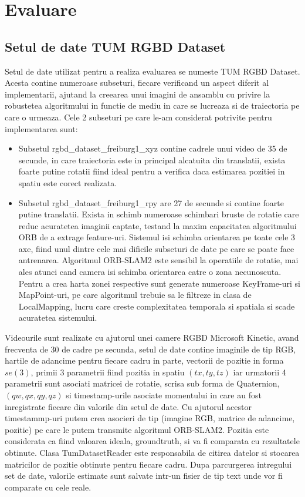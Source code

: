 \documentclass[12pt,a4paper]{report}
\begin{document}
\chapter{Evaluare}
\section{Setul de date TUM RGBD Dataset}
Setul de date utilizat pentru a realiza evaluarea se numeste TUM RGBD Dataset. 
Acesta contine numeroase subseturi, fiecare verificand un aspect diferit al implementarii, 
ajutand la creearea unui imagini de ansamblu cu privire la robustetea algoritmului in functie 
de mediu in care se lucreaza si de traiectoria pe care o urmeaza. Cele 2 subseturi pe 
care le-am considerat potrivite pentru implementarea sunt:
\begin{itemize}
    \item Subsetul rgbd\_dataset\_freiburg1\_xyz contine cadrele unui video de 35 de secunde, in care
traiectoria este in principal alcatuita din translatii, exista foarte putine rotatii fiind
ideal pentru a verifica daca estimarea pozitiei in spatiu este corect realizata.    
    \item  Subsetul rgbd\_dataset\_freiburg1\_rpy are 27 de secunde si contine 
foarte putine translatii. Exista in schimb numeroase schimbari bruste de rotatie care reduc
acuratetea imaginii captate, testand la maxim capacitatea algoritmului ORB de a extrage 
feature-uri. Sistemul isi schimba orientarea pe toate cele 3 axe, fiind unul dintre cele
mai dificile subseturi de date pe care se poate face antrenarea. Algoritmul 
ORB-SLAM2 este sensibil la operatiile de rotatie, mai ales atunci cand camera isi schimba 
orientarea catre o zona necunoscuta. Pentru a crea harta zonei respective sunt generate 
numeroase KeyFrame-uri si MapPoint-uri, pe care algoritmul trebuie sa le filtreze in clasa
de LocalMapping, lucru care creste complexitatea temporala si spatiala si scade acuratetea
sistemului.  
\end{itemize}   
Videourile sunt realizate 
cu ajutorul unei camere RGBD Microsoft Kinetic, avand frecventa de 30 de cadre pe secunda, 
setul de date contine imaginile de tip RGB, hartile de adancime pentru fiecare cadru in parte,
vectorii de pozitie in forma $ se(3) $, primii 3 parametrii fiind pozitia in spatiu 
$ (tx, ty, tz) $ iar urmatorii 4 parametrii sunt asociati matricei de rotatie, scrisa sub
forma de Quaternion, $ (qw, qx, qy, qz) $ si timestamp-urile asociate momentului in care 
au fost inregistrate fiecare din valorile din setul de date. Cu ajutorul acestor timestammp-uri
putem crea asocieri de tip (imagine RGB, matrice de adancime, pozitie) pe care le putem 
transmite algoritmul ORB-SLAM2. Pozitia este considerata ca fiind valoarea ideala, groundtruth,
si va fi comparata cu rezultatele obtinute. Clasa TumDatasetReader este responsabila de citirea
datelor si stocarea matricilor de pozitie obtinute pentru fiecare cadru. Dupa parcurgerea 
intregului set de date, valorile estimate sunt salvate intr-un fisier de tip text unde vor 
fi comparate cu cele reale.
\end{document}
